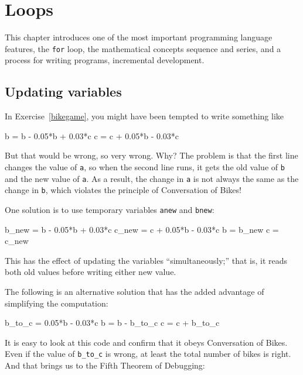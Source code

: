 
\chapter{Loops}

This chapter introduces one of the most important programming language features, the {\tt for} loop, the mathematical concepts sequence and series, and a process for writing programs, incremental development.

\section{Updating variables}

In Exercise~\ref{bikegame}, you might have been tempted to write something
like


\begin{code}
b = b - 0.05*b + 0.03*c
c = c + 0.05*b - 0.03*c
\end{code}

But that would be wrong, so very wrong.  Why?  The problem is that
the first line changes the value of {\tt a}, so when the second line
runs, it gets the old value of {\tt b} and the new value of {\tt a}.
As a result, the change in {\tt a} is not always the same as the
change in {\tt b}, which violates the principle of Conversation
of Bikes!

One solution is to use temporary variables {\tt anew} and {\tt bnew}:

\begin{code}
b_new = b - 0.05*b + 0.03*c
c_new = c + 0.05*b - 0.03*c
b = b_new
c = c_new
\end{code}

This has the effect of updating the variables ``simultaneously;'' that
is, it reads both old values before writing either new value.


The following is an alternative solution that
has the added advantage of simplifying the computation:

\begin{code}
b_to_c = 0.05*b - 0.03*c
b = b - b_to_c
c = c + b_to_c
\end{code}


It is easy to look at this code and confirm that it obeys Conversation
of Bikes.  Even if the value of \verb"b_to_c" is wrong, at least the total
number of bikes is right.  And that brings us to the Fifth Theorem of
Debugging:

